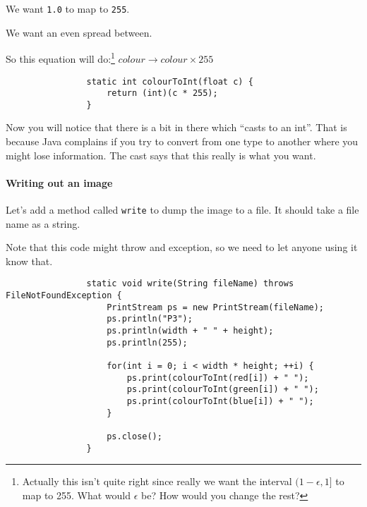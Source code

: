 \documentclass{article}
\begin{document}
            We want \texttt{1.0} to map to \texttt{255}.
            
            We want an even spread between.
            
            So this equation will do:\footnote{Actually this isn't quite right since really we want the interval $(1-\epsilon,1]$ to map to 255. What would $\epsilon$ be? How would you change the rest?} 
            $colour \rightarrow colour \times 255$
            
            \begin{verbatim}
                static int colourToInt(float c) {
                    return (int)(c * 255);
                }
            \end{verbatim}

            Now you will notice that there is a bit in there which ``casts to an int''. That is because Java complains if you try to
            convert from one type to another where you might lose information.  The cast says that this really is what you want.
            
        \paragraph{Writing out an image}
            Let's add a method called \texttt{write} to dump the image to a file.  It should take a file name as a string.
            
            Note that this code might throw and exception, so we need to let anyone using it know that.
            
            \begin{verbatim} 
                static void write(String fileName) throws FileNotFoundException {
                    PrintStream ps = new PrintStream(fileName);
                    ps.println("P3");
                    ps.println(width + " " + height);
                    ps.println(255);
                    
                    for(int i = 0; i < width * height; ++i) {
                        ps.print(colourToInt(red[i]) + " ");
                        ps.print(colourToInt(green[i]) + " ");
                        ps.print(colourToInt(blue[i]) + " ");
                    }
                    
                    ps.close();
                }
            \end{verbatim}
        
        \newpage
\end{document}
